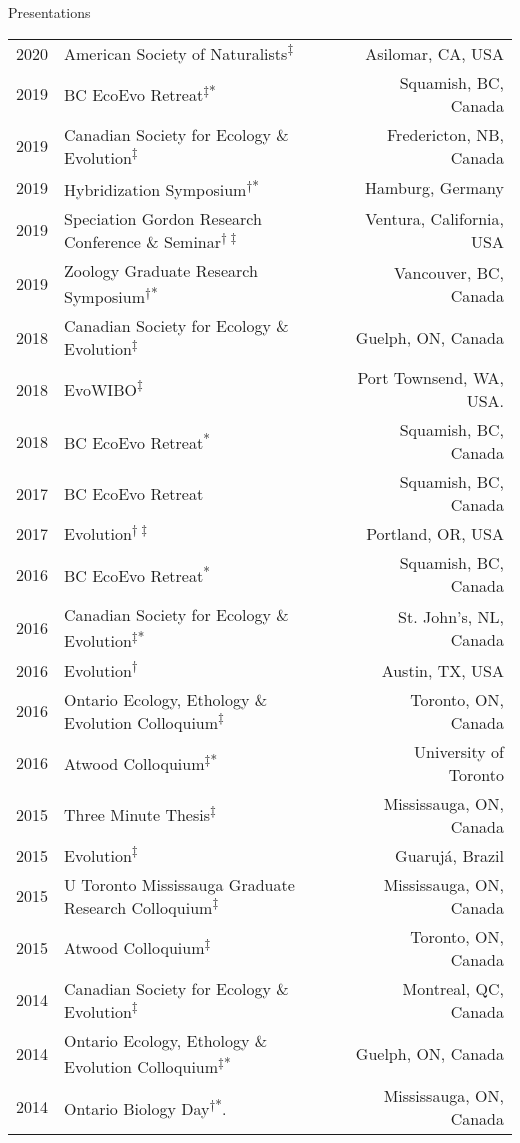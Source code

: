 \documentclass[11pt]{article}
\begin{document}
\begin{rSection}{Presentations}
\begin{tabular}{llr}
2020 & American Society of Naturalists\textsuperscript{$\ddagger$} & Asilomar, CA, USA\\
2019 & BC EcoEvo Retreat\textsuperscript{$\ddagger$}\textsuperscript{*} & Squamish, BC, Canada \\
2019 & Canadian Society for Ecology \& Evolution\textsuperscript{$\ddagger$} & Fredericton, NB, Canada\\
2019 & Hybridization Symposium\textsuperscript{$\dag$*} & Hamburg, Germany\\
2019 & Speciation Gordon Research Conference \& Seminar\textsuperscript{$\dag\ddagger$} & Ventura, California, USA\\
2019 & Zoology Graduate Research Symposium\textsuperscript{$\dag$*} & Vancouver, BC, Canada\\
2018 & Canadian Society for Ecology \& Evolution\textsuperscript{$\ddagger$} & Guelph, ON, Canada\\
2018 & EvoWIBO\textsuperscript{$\ddagger$} & Port Townsend, WA, USA.\\
2018 & BC EcoEvo Retreat\textsuperscript{*} & Squamish, BC, Canada \\
2017 & BC EcoEvo Retreat & Squamish, BC, Canada \\
2017 & Evolution\textsuperscript{$\dag\ddagger$} & Portland, OR, USA\\
2016 & BC EcoEvo Retreat\textsuperscript{*} & Squamish, BC, Canada \\
2016 & Canadian Society for Ecology \& Evolution\textsuperscript{$\ddagger$*} & St. John’s, NL, Canada\\
2016 & Evolution\textsuperscript{$\dag$} & Austin, TX, USA\\
2016 & Ontario Ecology, Ethology \& Evolution Colloquium\textsuperscript{$\ddagger$} & Toronto, ON, Canada\\
2016 & Atwood Colloquium\textsuperscript{$\ddagger$*} & University of Toronto\\
2015 & Three Minute Thesis\textsuperscript{$\ddagger$} & Mississauga, ON, Canada\\
2015 & Evolution\textsuperscript{$\ddagger$} & Guaruj\'a, Brazil\\
2015 & U Toronto Mississauga Graduate Research Colloquium\textsuperscript{$\ddagger$} & Mississauga, ON, Canada\\
2015 & Atwood Colloquium\textsuperscript{$\ddagger$} & Toronto, ON, Canada\\
2014 & Canadian Society for Ecology \& Evolution\textsuperscript{$\ddagger$} & Montreal, QC, Canada\\
2014 & Ontario Ecology, Ethology \& Evolution Colloquium\textsuperscript{$\ddagger$*} & Guelph, ON, Canada\\
2014 & Ontario Biology Day\textsuperscript{$\dagger$*}. & Mississauga, ON, Canada\\
\end{tabular}

\end{rSection}
\vspace{1em}
\end{document}
